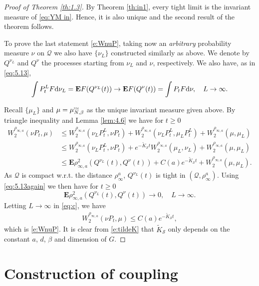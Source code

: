 \documentclass[11pt,UTF-8,reqno]{amsart}
\numberwithin{equation}{section}
\def\theequation{\arabic{section}.\arabic{equation}}
\def\dif{{\mathord{{\rm d}}}}
\def\no{\nonumber}
\def\cQ{{\mathcal Q}}
\def\cS{{\mathcal S}}
\def\E{\mathbf E}
\def\geq{\geqslant}
\def\leq{\leqslant}
\def\E{\mathbf{E}}
\def\dif{{\mathord{{\rm d}}}}
\def\no{\nonumber}
\def\geq{\geqslant}
\def\leq{\leqslant}
\def\YM{\textnormal{\tiny \textsc{ym}}}
\def\muYM{\mu^{\YM}_{N,\beta}}
\begin{document}
\begin{proof}[Proof of Theorem \ref{th:1.3}]
By Theorem \ref{th:in1}, every tight limit is the invariant measure of \eqref{eq:YM in}. Hence, it is also unique and the second result of the theorem follows.

To prove the last statement \eqref{e:WnuP},
taking now an {\it arbitrary} probability measure $\nu$ on $\cQ$  we also have $\{\nu_L\}$  constructed similarly as above. 
We denote by $Q^{\nu_L}$ and $Q^\nu$ the processes starting from $\nu_L$ and $\nu$, respectively.  
We also have, as in \eqref{eq:5.13},
\begin{align}\label{eq:5.13again}
	 \int P_t^LF\dif \nu_L
	 =\E F(Q^{\nu_L}(t))
	 \to \E F(Q^\nu(t))
	 =\int P_tF\dif \nu, \quad L\to\infty.
\end{align}

Recall $\{\mu_L\}$ and $\mu=\muYM$ as the unique invariant measure given above. 
By triangle inequality and Lemma \ref{lem:4.6} we have for $t\geq0$
\begin{align}
	W_2^{\rho_{\infty,a}}(\nu P_t,\mu)
	&\leq W_2^{\rho_{\infty,a}}(\nu_L P_t^L,\nu P_t)
	+W_2^{\rho_{\infty,a}}(\nu_L P_t^L,\mu_L P_t^L)
	+W_2^{\rho_{\infty,a}}(\mu,\mu_L )\no
	\\
	&\leq W_2^{\rho_{\infty,a}}(\nu_L P_t^L,\nu P_t)
	+ e^{-\widetilde{K}_{\cS}t}W_2^{\rho_{\infty,a}}(\mu_L ,\nu_L )
	+W_2^{\rho_{\infty,a}}(\mu,\mu_L )  \no
	\\
	&\leq \E\rho_{\infty,a}^2(Q^{\nu_L}(t), Q^\nu(t))
	+C(a) e^{-\widetilde{K}_{\cS}t}
	+W_2^{\rho_{\infty,a}}(\mu,\mu_L ).\label{eq:c}
\end{align}
As $\cQ$ is compact w.r.t. the distance $\rho_\infty^a$, 
$Q^{\nu_L}(t)$ is tight in $(\cQ,\rho_\infty^a)$. 
Using \eqref{eq:5.13again} we then have for $t\geq0$
 $$\E\rho_{\infty,a}^2(Q^{\nu_L}(t), Q^\nu(t))\to0,\quad  L\to\infty.$$
Letting $L\to\infty$ in \eqref{eq:c}, we have
\begin{align*}
	W_2^{\rho_{\infty,a}}(\nu P_t,\mu)
	\leq C(a) e^{-\widetilde{K}_{\cS}t},
\end{align*}
which is  \eqref{e:WnuP}.
It is clear from \eqref{e:tildeK} that 
 $\widetilde{K}_{\cS}$   only depends on the constant $a$,  $d$, $\beta$ and dimension of $G$.
\end{proof}


 \appendix
\renewcommand{\appendixname}{Appendix~\Alph{section}}
\renewcommand{\theequation}{A.\arabic{equation}}
\section{Construction of coupling}
\label{sec:coupling}
\end{document}
